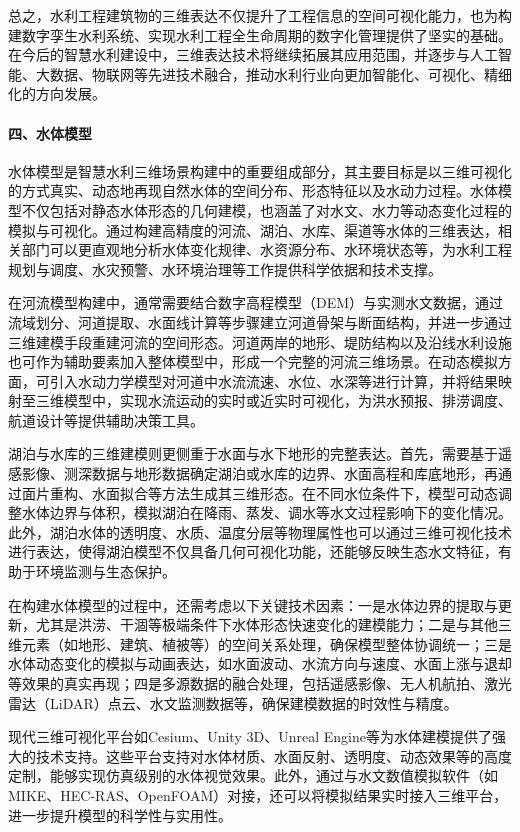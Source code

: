 总之，水利工程建筑物的三维表达不仅提升了工程信息的空间可视化能力，也为构建数字孪生水利系统、实现水利工程全生命周期的数字化管理提供了坚实的基础。在今后的智慧水利建设中，三维表达技术将继续拓展其应用范围，并逐步与人工智能、大数据、物联网等先进技术融合，推动水利行业向更加智能化、可视化、精细化的方向发展。

\paragraph{四、水体模型}\label{ux56dbux6c34ux4f53ux6a21ux578b}

水体模型是智慧水利三维场景构建中的重要组成部分，其主要目标是以三维可视化的方式真实、动态地再现自然水体的空间分布、形态特征以及水动力过程。水体模型不仅包括对静态水体形态的几何建模，也涵盖了对水文、水力等动态变化过程的模拟与可视化。通过构建高精度的河流、湖泊、水库、渠道等水体的三维表达，相关部门可以更直观地分析水体变化规律、水资源分布、水环境状态等，为水利工程规划与调度、水灾预警、水环境治理等工作提供科学依据和技术支撑。

在河流模型构建中，通常需要结合数字高程模型（DEM）与实测水文数据，通过流域划分、河道提取、水面线计算等步骤建立河道骨架与断面结构，并进一步通过三维建模手段重建河流的空间形态。河道两岸的地形、堤防结构以及沿线水利设施也可作为辅助要素加入整体模型中，形成一个完整的河流三维场景。在动态模拟方面，可引入水动力学模型对河道中水流流速、水位、水深等进行计算，并将结果映射至三维模型中，实现水流运动的实时或近实时可视化，为洪水预报、排涝调度、航道设计等提供辅助决策工具。

湖泊与水库的三维建模则更侧重于水面与水下地形的完整表达。首先，需要基于遥感影像、测深数据与地形数据确定湖泊或水库的边界、水面高程和库底地形，再通过面片重构、水面拟合等方法生成其三维形态。在不同水位条件下，模型可动态调整水体边界与体积，模拟湖泊在降雨、蒸发、调水等水文过程影响下的变化情况。此外，湖泊水体的透明度、水质、温度分层等物理属性也可以通过三维可视化技术进行表达，使得湖泊模型不仅具备几何可视化功能，还能够反映生态水文特征，有助于环境监测与生态保护。

在构建水体模型的过程中，还需考虑以下关键技术因素：一是水体边界的提取与更新，尤其是洪涝、干涸等极端条件下水体形态快速变化的建模能力；二是与其他三维元素（如地形、建筑、植被等）的空间关系处理，确保模型整体协调统一；三是水体动态变化的模拟与动画表达，如水面波动、水流方向与速度、水面上涨与退却等效果的真实再现；四是多源数据的融合处理，包括遥感影像、无人机航拍、激光雷达（LiDAR）点云、水文监测数据等，确保建模数据的时效性与精度。

现代三维可视化平台如Cesium、Unity 3D、Unreal
Engine等为水体建模提供了强大的技术支持。这些平台支持对水体材质、水面反射、透明度、动态效果等的高度定制，能够实现仿真级别的水体视觉效果。此外，通过与水文数值模拟软件（如MIKE、HEC-RAS、OpenFOAM）对接，还可以将模拟结果实时接入三维平台，进一步提升模型的科学性与实用性。

